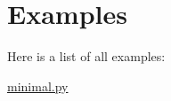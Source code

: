 \section{Examples}
Here is a list of all examples\-:\begin{DoxyCompactItemize}
\item 
\hyperlink{minimal_8py-example}{minimal.\-py}
\end{DoxyCompactItemize}
